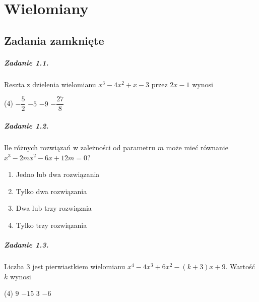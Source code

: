 \chapter{Wielomiany}

\section{Zadania zamknięte}

\paragraph{Zadanie 1.1.} Reszta z dzielenia wielomianu $x^3 - 4x^2 + x -3$ przez $2x - 1$ wynosi
\begin{tasks}(4)
	\task $-\dfrac{5}{2}$
	\task $-5$
	\task $-9$
	\task $-\dfrac{27}{8}$
\end{tasks}

\paragraph{Zadanie 1.2.} Ile różnych rozwiązań w zależności od parametru $m$ może mieć równanie $x^3 - 2mx^2 - 6x + 12m = 0$?
\begin{enumerate}[label=\alph*)]
	\item Jedno lub dwa rozwiązania
	\item Tylko dwa rozwiązania
	\item Dwa lub trzy rozwiąznia
	\item Tylko trzy rozwiązania
\end{enumerate}

\paragraph{Zadanie 1.3.} Liczba $3$ jest pierwiastkiem wielomianu ${x^4 - 4x^3 + 6x^2 - (k + 3)x + 9}$. Wartość $k$ wynosi
\begin{tasks}(4)
	\task $9$
	\task $-15$
	\task $3$
	\task $-6$
\end{tasks}